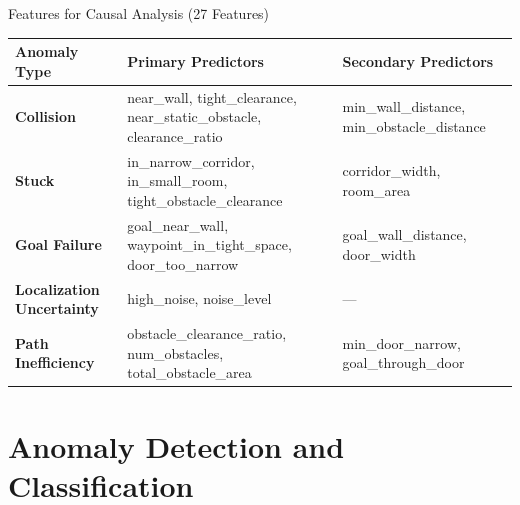 \documentclass[aspectratio=169, 11pt]{beamer}
\begin{document}
\begin{frame}{Features for Causal Analysis (27 Features)}
  \begin{table}
    \tiny
    \renewcommand{\arraystretch}{1.3}
    \begin{tabular}{@{}L{2.0cm} L{6.0cm} L{4.5cm}@{}}
      \toprule
      \textbf{Anomaly Type} & \textbf{Primary Predictors} & \textbf{Secondary Predictors} \\
      \midrule
      \textbf{Collision} & near\_wall, tight\_clearance, near\_static\_obstacle, clearance\_ratio & min\_wall\_distance, min\_obstacle\_distance \\
      \textbf{Stuck} & in\_narrow\_corridor, in\_small\_room, tight\_obstacle\_clearance & corridor\_width, room\_area \\
      \textbf{Goal Failure} & goal\_near\_wall, waypoint\_in\_tight\_space, door\_too\_narrow & goal\_wall\_distance, door\_width \\
      \textbf{Localization Uncertainty} & high\_noise, noise\_level & --- \\
      \textbf{Path Inefficiency} & obstacle\_clearance\_ratio, num\_obstacles, total\_obstacle\_area & min\_door\_narrow, goal\_through\_door \\
      \bottomrule
    \end{tabular}
  \end{table}
\end{frame}

\section{Anomaly Detection and Classification}
\end{document}
